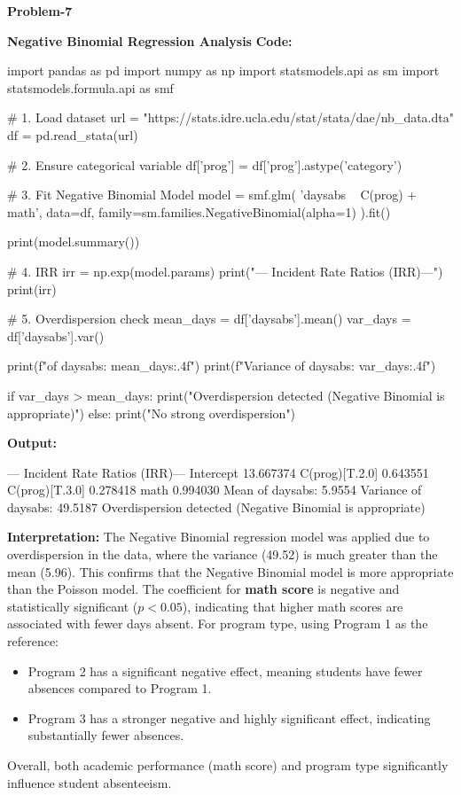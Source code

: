 \documentclass[12pt,a4paper]{article}
\begin{document}
\begin{center}
\Large \textbf{Problem-7}
\end{center}
\textbf{Negative Binomial Regression Analysis}
\textbf{Code:}
\begin{codebox}
import pandas as pd
import numpy as np
import statsmodels.api as sm
import statsmodels.formula.api as smf

# 1. Load dataset
url = "https://stats.idre.ucla.edu/stat/stata/dae/nb_data.dta"
df = pd.read_stata(url)

# 2. Ensure categorical variable
df['prog'] = df['prog'].astype('category')

# 3. Fit Negative Binomial Model
model = smf.glm(
    'daysabs ~ C(prog) + math',
    data=df,
    family=sm.families.NegativeBinomial(alpha=1)
).fit()

print(model.summary())

# 4. IRR
irr = np.exp(model.params)
print("\n--- Incident Rate Ratios (IRR)---")
print(irr)

# 5. Overdispersion check
mean_days = df['daysabs'].mean()
var_days = df['daysabs'].var()

print(f"\nMean of daysabs: {mean_days:.4f}")
print(f"Variance of daysabs: {var_days:.4f}")

if var_days > mean_days:
    print("Overdispersion detected
    (Negative Binomial is appropriate)")
else:
    print("No strong overdispersion")
\end{codebox}

\textbf{Output:}
\begin{codebox}
--- Incident Rate Ratios (IRR)---
Intercept 13.667374
C(prog)[T.2.0] 0.643551
C(prog)[T.3.0] 0.278418
math 0.994030
Mean of daysabs: 5.9554
Variance of daysabs: 49.5187
Overdispersion detected (Negative Binomial is appropriate)
\end{codebox}

\textbf{Interpretation:}
The Negative Binomial regression model was applied due to overdispersion in the data, where the variance (49.52) is much greater than the mean (5.96).
This confirms that the Negative Binomial model is more appropriate than the Poisson model.
The coefficient for \textbf{math score} is negative and statistically significant ($p < 0.05$), indicating that higher math scores are associated with fewer days absent.
For program type, using Program 1 as the reference:
\begin{itemize}
\item Program 2 has a significant negative effect, meaning students have fewer absences compared to Program 1.
\item Program 3 has a stronger negative and highly significant effect, indicating substantially fewer absences.
\end{itemize}
Overall, both academic performance (math score) and program type significantly influence student absenteeism.
\end{document}
